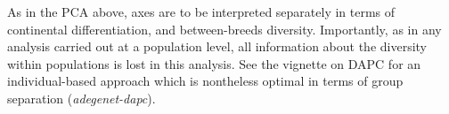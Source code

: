 \documentclass{article}
\begin{document}
\noindent As in the PCA above, axes are to be interpreted separately in terms of continental differentiation, and between-breeds diversity.
Importantly, as in any analysis carried out at a population level, all information about the
diversity within populations is lost in this analysis.
See the vignette on DAPC for an individual-based approach which is nontheless optimal in terms of
group separation (\textit{adegenet-dapc}).






\end{document}
